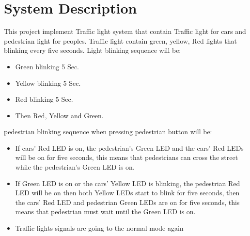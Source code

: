 \documentclass[pdftex,10pt,a4paper,oneside]{article}
\begin{document}
\section{System Description}
This project implement  Traffic light system that contain Traffic light for cars and pedestrian light for peoples. Traffic light contain green, yellow, Red lights that blinking every five seconds. 
Light blinking sequence will be:
\begin{itemize}
	\item Green blinking 5 Sec.
	\item Yellow blinking 5 Sec.
	\item Red blinking 5 Sec.
	\item Then Red, Yellow and Green.
  \end{itemize} 
pedestrian blinking sequence when pressing pedestrian button will be:
\begin{itemize}
	\item If cars' Red LED is on, the pedestrian's Green LED and the cars' Red LEDs will be on for five seconds, this means that pedestrians can cross the street while the pedestrian's Green LED is on.
	\item If Green LED is on or the cars' Yellow 
	LED is blinking, the pedestrian Red LED will be on
	 then both Yellow LEDs start to blink for five seconds, then the cars' Red LED and pedestrian Green LEDs are on for five seconds, this means that pedestrian must wait until the Green LED is on.
	\item Traffic lights signals are going to the normal mode again
  \end{itemize} 
\end{document}
